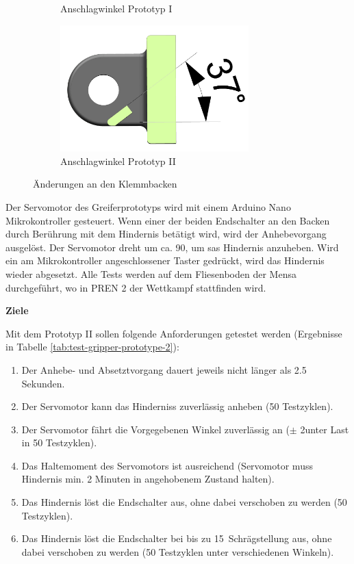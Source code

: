 \begin{figure}[H]
\begin{subfigure}{0.49\textwidth}
\caption{Anschlagwinkel Prototyp I}
\label{fig:jaw_old_section}
\end{subfigure}
\begin{subfigure}{0.49\textwidth}
\centering
\includegraphics[width=0.8\textwidth]{assets/greifer-prototyp/Backe_neu_schnitt.png}
\caption{Anschlagwinkel Prototyp II}
\label{fig:jaw_new_section}
\end{subfigure}
\caption{Änderungen an den Klemmbacken}
\label{fig:jaw_iteration}
\end{figure}

Der Servomotor des Greiferprototyps wird mit einem Arduino Nano Mikrokontroller gesteuert. Wenn einer der beiden Endschalter an den Backen durch Berührung mit dem Hindernis betätigt wird, wird der Anhebevorgang ausgelöst. Der Servomotor dreht um ca. 90\textdegree,  
um sas Hindernis anzuheben. Wird ein am Mikrokontroller angeschlossener Taster gedrückt, wird das Hindernis wieder abgesetzt. Alle Tests werden auf dem Fliesenboden der Mensa durchgeführt, wo in PREN 2 der Wettkampf stattfinden wird.

\textbf{Ziele}

Mit dem Prototyp II sollen folgende Anforderungen getestet werden (Ergebnisse in Tabelle \ref{tab:test-gripper-prototype-2}):

\begin{enumerate}
    \item Der Anhebe- und Absetztvorgang dauert jeweils nicht länger als 2.5 Sekunden.
    \item Der Servomotor kann das Hinderniss zuverlässig anheben (50 Testzyklen).
    \item Der Servomotor fährt die Vorgegebenen Winkel zuverlässig an ($\pm$ 2\textdegree unter Last in 50 Testzyklen).
    \item Das Haltemoment des Servomotors ist ausreichend (Servomotor muss Hindernis min. 2 Minuten in angehobenem Zustand halten).
    \item Das Hindernis löst die Endschalter aus, ohne dabei verschoben zu werden (50 Testzyklen).
    \item Das Hindernis löst die Endschalter bei bis zu 15\textdegree\ Schrägstellung aus, ohne dabei verschoben zu werden (50 Testzyklen unter verschiedenen Winkeln).
\end{enumerate}

